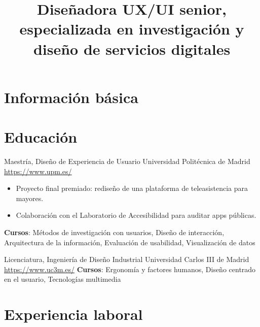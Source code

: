 \documentclass[a4paper, serif, 10pt]{moderncv}
\title{Diseñadora UX/UI senior, especializada en investigación y diseño de servicios digitales}
\begin{document}
\maketitle

\section{Información básica}

\section{Educación}

        {Maestría, Diseño de Experiencia de Usuario}
        {Universidad Politécnica de Madrid}
        {\url{https://www.upm.es/}}
        {}
        {\begin{itemize}
\item Proyecto final premiado: rediseño de una plataforma de teleasistencia para mayores.
\item Colaboración con el Laboratorio de Accesibilidad para auditar apps públicas.
\end{itemize}
\textbf{Cursos}: Métodos de investigación con usuarios, Diseño de interacción, Arquitectura de la información, Evaluación de usabilidad, Visualización de datos}

        {Licenciatura, Ingeniería de Diseño Industrial}
        {Universidad Carlos III de Madrid}
        {\url{https://www.uc3m.es/}}
        {}
        {\textbf{Cursos}: Ergonomía y factores humanos, Diseño centrado en el usuario, Tecnologías multimedia}
\section{Experiencia laboral}
\end{document}
